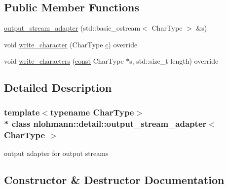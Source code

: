 \subsection*{Public Member Functions}
\begin{DoxyCompactItemize}
\item 
\hyperlink{classnlohmann_1_1detail_1_1output__stream__adapter_a4e78a9bd19cbf3a4191adc62d14f0055}{output\+\_\+stream\+\_\+adapter} (std\+::basic\+\_\+ostream$<$ Char\+Type $>$ \&s)
\item 
void \hyperlink{classnlohmann_1_1detail_1_1output__stream__adapter_a6e2698c76b200b2d8fac6cebfc43a245}{write\+\_\+character} (Char\+Type \hyperlink{functions__f_8js_aadfd49790b56c82605242ff3896447ed}{c}) override
\item 
void \hyperlink{classnlohmann_1_1detail_1_1output__stream__adapter_ad61375497a7d03cb0bdcddfdaad185d0}{write\+\_\+characters} (\hyperlink{functions__c_8js_afacfd9c985d225bb07483b887a801b6f}{const} Char\+Type $\ast$s, std\+::size\+\_\+t length) override
\end{DoxyCompactItemize}


\subsection{Detailed Description}
\subsubsection*{template$<$typename Char\+Type$>$\\*
class nlohmann\+::detail\+::output\+\_\+stream\+\_\+adapter$<$ Char\+Type $>$}

output adapter for output streams 

\subsection{Constructor \& Destructor Documentation}
